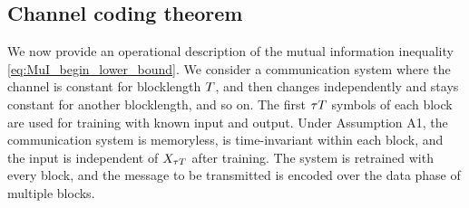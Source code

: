 \documentclass[12pt, draftclsnofoot,journal,onecolumn]{IEEEtran}
\begin{document}
\subsection{Channel coding theorem}
\label{subsec:channel_coding_thm_SISO}
We now provide an operational description of the mutual information inequality \eqref{eq:MuI_begin_lower_bound}. 
We consider a communication system where the channel is constant for blocklength $T$, and then changes independently and stays constant for another blocklength, and so on. The first ${\tau T}$ symbols of each block are used for training with known input and output.
Under Assumption A1, the communication system is memoryless, is time-invariant within each block, and the input is \iid independent of $X_{{\tau T}}$ after training.  The system is retrained with every block, and the message to be transmitted is encoded over the data phase of multiple blocks. 
\end{document}
